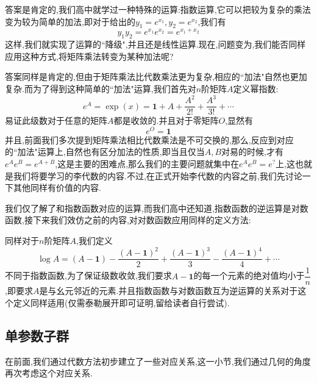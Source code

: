 答案是肯定的,我们高中就学过一种特殊的运算:指数运算,它可以把较为复杂的乘法变为较为简单的加法,即对于给出的$y_1=e^{x_1},y_2=e^{x_2}$,我们有
\begin{equation}
    y_1y_2=e^{x_1}e^{x_2}=e^{x_1+x_2}
\end{equation}
这样,我们就实现了运算的``降级",并且还是线性运算.现在,问题变为,我们能否同样应用这种方式,将矩阵乘法转变为某种加法呢?

答案同样是肯定的,但由于矩阵乘法比代数乘法更为复杂,相应的``加法"自然也更加复杂.而为了得到这种简单的``加法"运算,我们首先对$n$阶矩阵$A$定义幂指数:
\begin{equation}
    e^A=\exp(x)=\textbf{1}+A+\frac{A^2}{2!}+\frac{A^3}{3!}+\cdots 
\end{equation}
易证此级数对于任意的矩阵$A$都是收敛的.并且对于零矩阵$O$,显然有
\begin{equation}
    e^O=\textbf{1}
\end{equation}
并且,前面我们多次提到矩阵乘法相比代数乘法是不可交换的,那么,反应到对应的``加法"运算上,自然也有区分加法的性质,即当且仅当$A,B$对易的时候,才有$e^Ae^B=e^{A+B}$,这是主要的困难点,那么我们的主要问题就集中在$e^Ae^B=e^{?}$上,这也就是我们将要学习的李代数的内容.不过,在正式开始李代数的内容之前,我们先讨论一下其他同样有价值的内容.

我们仅了解了和指数函数对应的运算,而我们高中还知道,指数函数的逆运算是对数函数,接下来我们效仿之前的内容,对对数函数应用同样的定义方法:

同样对于$n$阶矩阵$A$,我们定义
\begin{equation}
    \log A=(A-\textbf{1})-\frac{(A-\textbf{1})^2}2+\frac{(A-\textbf{1})^3}3-\frac{(A-\textbf{1})^4}4+\cdots 
\end{equation}
不同于指数函数,为了保证级数收敛,我们要求$A-\textbf{1}$的每一个元素的绝对值均小于$\dfrac{1}{n}$,即要求$A$是与幺元邻近的元素.并且指数函数与对数函数互为逆运算的关系对于这个定义同样适用(仅需泰勒展开即可证明,留给读者自行尝试).
\subsection{单参数子群}
在前面,我们通过代数方法初步建立了一些对应关系,这一小节,我们通过几何的角度再次考虑这个对应关系.

